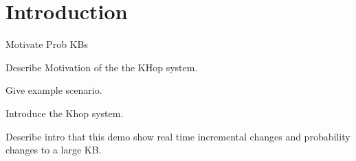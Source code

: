

\section{Introduction}

Motivate Prob KBs

Describe Motivation of the the KHop system.

Give example scenario.

Introduce the Khop system.

Describe intro that this demo show real time incremental changes and probability changes to a large KB.
